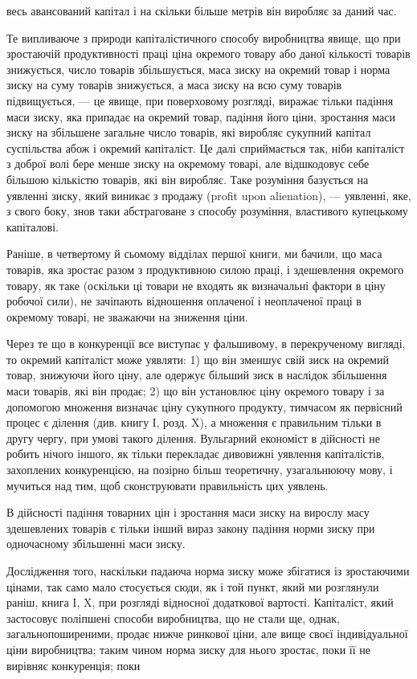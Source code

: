 \parcont{}  %
весь авансований капітал і на скільки більше метрів він виробляє за даний час.

Те випливаюче з природи капіталістичного способу виробництва явище, що при зростаючій продуктивності
праці ціна окремого товару або даної кількості товарів знижується, число товарів збільшується, маса
зиску на окремий товар і норма зиску на суму товарів знижується, а маса зиску на всю суму товарів
підвищується, — це явище, при поверховому розгляді, виражає тільки падіння маси зиску, яка припадає
на окремий товар, падіння його ціни, зростання маси зиску на збільшене загальне
число товарів, які виробляє сукупний капітал суспільства абож і окремий капіталіст. Це далі
сприймається так, ніби капіталіст з доброї волі бере менше зиску на окремому товарі, але відшкодовує
себе більшою кількістю товарів, які він виробляє. Таке розуміння базується на уявленні зиску, який
виникає з продажу (profit upon alienation), — уявленні, яке, з свого боку, знов таки абстраговане з
способу розуміння, властивого купецькому капіталові.

Раніше, в четвертому й сьомому відділах першої книги, ми бачили, що маса товарів, яка зростає разом
з продуктивною силою праці, і здешевлення окремого товару, як таке (оскільки ці товари не входять як
визначальні фактори в ціну робочої сили), не зачіпають відношення оплаченої і неоплаченої праці в
окремому товарі, не зважаючи на зниження ціни.

Через те що в конкуренції все виступає у фальшивому, в перекрученому вигляді, то окремий капіталіст
може уявляти: 1) що він зменшує свій зиск на окремий товар, знижуючи його ціну, але одержує більший
зиск в наслідок збільшення маси товарів, які він продає; 2) що він установлює ціну окремого товару і
за допомогою множення визначає ціну сукупного продукту, тимчасом як первісний процес є ділення (див.
книгу І, розд. X), а множення є правильним тільки в другу чергу, при умові такого ділення.
Вульгарний економіст в дійсності не робить нічого іншого, як тільки перекладає дивовижні уявлення
капіталістів, захоплених конкуренцією, на позірно більш теоретичну, узагальнюючу мову, і мучиться
над тим, щоб сконструювати правильність цих уявлень.

В дійсності падіння товарних цін і зростання маси зиску на вирослу масу здешевлених товарів є тільки
інший вираз закону падіння норми зиску при одночасному збільшенні маси зиску.

Дослідження того, наскільки падаюча норма зиску може збігатися із зростаючими цінами, так само мало
стосується сюди, як і той пункт, який ми розглянули раніш, книга I, X, при розгляді відносної
додаткової вартості. Капіталіст, який застосовує поліпшені способи виробництва, що не стали ще,
однак, загальнопоширеними, продає нижче ринкової ціни, але вище своєї індивідуальної ціни
виробництва; таким чином норма зиску для нього зростає, поки її не вирівняє конкуренція; поки
\parbreak{}  %

